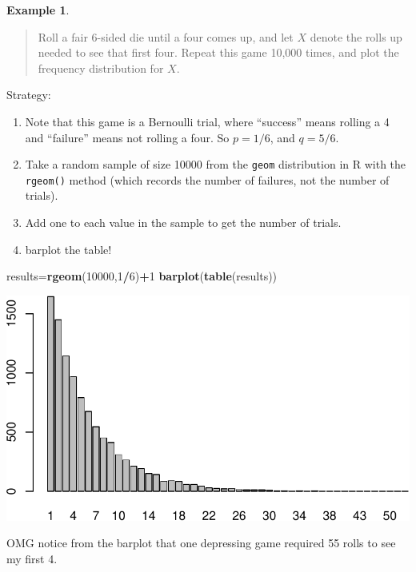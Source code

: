 \documentclass[
]{book}
\newenvironment{Shaded}{\begin{snugshade}}{\end{snugshade}}
\newcommand{\DecValTok}[1]{\textcolor[rgb]{0.00,0.00,0.81}{#1}}
\newcommand{\FunctionTok}[1]{\textcolor[rgb]{0.13,0.29,0.53}{\textbf{#1}}}
\newcommand{\NormalTok}[1]{#1}
\newcommand{\OtherTok}[1]{\textcolor[rgb]{0.56,0.35,0.01}{#1}}
\newcommand{\SpecialCharTok}[1]{\textcolor[rgb]{0.81,0.36,0.00}{\textbf{#1}}}
\providecommand{\tightlist}{%
  \setlength{\itemsep}{0pt}\setlength{\parskip}{0pt}}
\theoremstyle{definition}
\theoremstyle{definition}
\newtheorem{example}{Example}[chapter]
\theoremstyle{definition}
\theoremstyle{definition}
\theoremstyle{remark}
\begin{document}
\begin{example}
\protect\hypertarget{exm:roll-until-4-R}{}\label{exm:roll-until-4-R}\leavevmode

\begin{quote}
Roll a fair 6-sided die until a four comes up, and let \(X\) denote the rolls up needed to see that first four. Repeat this game 10,000 times, and plot the frequency distribution for \(X\).
\end{quote}

Strategy:

\begin{enumerate}
\def\labelenumi{\arabic{enumi}.}
\tightlist
\item
  Note that this game is a Bernoulli trial, where ``success'' means rolling a 4 and ``failure'' means not rolling a four. So \(p = 1/6\), and \(q = 5/6\).\\
\item
  Take a random sample of size 10000 from the \texttt{geom} distribution in R with the \texttt{rgeom()} method (which records the number of failures, not the number of trials).
\item
  Add one to each value in the sample to get the number of trials.
\item
  barplot the table!
\end{enumerate}

\begin{Shaded}
\begin{Highlighting}[]
\NormalTok{results}\OtherTok{=}\FunctionTok{rgeom}\NormalTok{(}\DecValTok{10000}\NormalTok{,}\DecValTok{1}\SpecialCharTok{/}\DecValTok{6}\NormalTok{)}\SpecialCharTok{+}\DecValTok{1}
\FunctionTok{barplot}\NormalTok{(}\FunctionTok{table}\NormalTok{(results))}
\end{Highlighting}
\end{Shaded}

\includegraphics{math340-notes_files/figure-latex/unnamed-chunk-151-1.pdf}

OMG notice from the barplot that one depressing game required 55 rolls to see my first 4.

\end{example}
\end{document}
